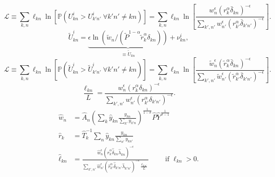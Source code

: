 \documentclass[11pt]{article}
\theoremstyle{definition}
\begin{document}
\begin{equation}\label{eq:loglikelihood}
\mathcal{L}
\equiv
\sum_{k,n} \ell_{kn} \ln \left[\mathbb{P}(U_{kn}^{i} > U_{k'n'}^{i} \ \forall k'n' \neq kn)\right] 
=
\sum_{k,n} \ell_{kn} \ln \left[
\frac
{{w}_{n}^\epsilon \left({r}_{k}^\alpha  \bar{\delta}_{kn}\right)^{-\epsilon}}
{\sum_{k',n'} {w}_{n'}^\epsilon \left({r}_{k'}^\alpha  \bar{\delta}_{k'n'}\right)^{-\epsilon}}
\right]
.\end{equation}
\begin{equation} \label{eqn:utility:beliefs}
\tilde{U}_{kn}^{i} = 
\underbrace{\epsilon \ln\left({\tilde{w}_n}/\left({\tilde{P}^{1-\alpha}\tilde{r}_{k}^{\alpha} \delta_{kn}}\right)\right)}_{\equiv \tilde{U}_{kn}} + \nu_{kn}^i
,
\end{equation}
\begin{equation}\label{eq:gran_loglikelihood}
\mathcal{L}
\equiv
\sum_{k,n} \ell_{kn} \ln \left[\mathbb{P}(\tilde{U}_{kn}^{i} > \tilde{U}_{k'n'}^{i} \ \forall k'n' \neq kn)\right]
=
\sum_{k,n} \ell_{kn} \ln \left[
\frac
{\tilde{w}_{n}^\epsilon \left(\tilde{r}_{k}^\alpha  \bar{\delta}_{kn}\right)^{-\epsilon}}
{\sum_{k',n'} \tilde{w}_{n'}^\epsilon \left(\tilde{r}_{k'}^\alpha  \bar{\delta}_{k'n'}\right)^{-\epsilon}}
\right]
.\end{equation}
\begin{equation}\label{eqn:cont_laborallocation}
\frac{\ell_{kn}}{L}
=
\frac
{w_{n}^\epsilon \left(r_{k}^\alpha  \delta_{kn}\right)^{-\epsilon}}
{\sum_{k',n'}w_{n'}^\epsilon \left(r_{k'}^\alpha  \delta_{k'n'}\right)^{-\epsilon}}
.
\end{equation}
\begin{align}
\hat{w}_{n}
&=
\hat{A}_n
\left(\sum_{k} \hat{y}_{kn}\frac{y_{kn}}{\sum_{k'} y_{k'n}}\right)^{\frac{1}{1-\sigma}}
\hat{P}
\hat{Y}^{\frac{1}{\sigma-1}}
\label{eqn:exacthatalgebra:wages}
\\
\hat{r}_{k}
&=
\hat{T}_{k}^{-1} \sum_{n}\hat{y}_{kn}\frac{y_{kn}}{\sum_{n'}y_{kn'}}
\label{eqn:exacthatalgebra:rents}
\\
\hat{\ell}_{kn} 
&=
\frac{\hat{w}_{n}^{\epsilon}\left(\hat{r}_{k}^{\alpha} \hat{\bar{\delta}}_{kn}\hat{ \lambda}_{kn} \right)^{-\epsilon}}{\sum_{k',n'} \hat{w}_{n'}^{\epsilon}\left(\hat{r}_{k'}^{\alpha} \hat{\bar{\delta}}_{k'n'}\hat{ \lambda}_{k'n'} \right)^{-\epsilon} \frac{\ell_{k'n'}}{L}} \qquad \text{ if } \ell_{kn} > 0
\label{eqn:exacthatalgebra:laborallocation}
.\end{align}
\end{document}

